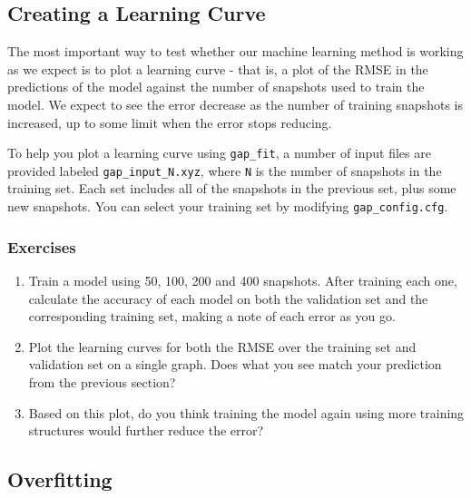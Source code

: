 \documentclass{article}
\begin{document}
\subsection{Creating a Learning Curve}

The most important way to test whether our machine learning method is working as we expect is to plot a learning curve - that is, a plot of the RMSE in the predictions of the model against the number of snapshots used to train the model. We expect to see the error decrease as the number of training snapshots is increased, up to some limit when the error stops reducing.

To help you plot a learning curve using \verb|gap_fit|, a number of input files are provided labeled \verb|gap_input_N.xyz|, where \verb|N| is the number of snapshots in the training set. Each set includes all of the snapshots in the previous set, plus some new snapshots. You can select your training set by modifying \verb|gap_config.cfg|.

\subsubsection*{Exercises}

\begin{enumerate}

\item Train a model using 50, 100, 200 and 400 snapshots. After training each one, calculate the accuracy of each model on both the validation set and the corresponding training set, making a note of each error as you go.
\item Plot the learning curves for both the RMSE over the training set and validation set on a single graph. Does what you see match your prediction from the previous section?
\item Based on this plot, do you think training the model again using more training structures would further reduce the error?

\end{enumerate}

\subsection{Overfitting}
\end{document}
